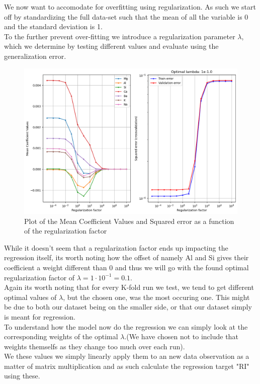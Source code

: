 We now want to accomodate for overfitting using regularization. As such we start off by standardizing the full data-set such that the mean of all the variable is 0 and the standard deviation is 1. \color[red]{It is worth noting that the helper function "rlr_validate" also standardizes its internal data partitions as a part of kfold cross-validation when it selects values of $\lambda$} \\
To the further prevent over-fitting we introduce a regularization parameter $\lambda$, which we determine by testing different values and evaluate using the generalization error.
\begin{figure}[H]
    \centering
    \includegraphics[width=15cm]{images/regularization.png}
    \caption{Plot of the Mean Coefficient Values and Squared error as a function of the regularization factor}
    \label{fig:regu_plot}
\end{figure}
While it doesn't seem that a regularization factor ends up impacting the regression itself, its worth noting how the offset of namely Al and Si gives their coefficient a weight different than 0 and thus we will go with the found optimal regularization factor of $\lambda = 1\cdot 10^{-1} = 0.1$. \\
Again its worth noting that for every K-fold run we test, we tend to get different optimal values of $\lambda$, but the chosen one, was the most occuring one. This might be due to both our dataset being on the smaller side, or that our dataset simply is meant for regression.\\

To understand how the model now do the regression we can simply look at the corresponding weights of the optimal $\lambda$.(We have chosen not to include that weights themselfs as they change too much over each run).\\We these values we simply linearly apply them to an new data observation as a matter of matrix multiplication and as such calculate the regression target "RI" using these.\\
\\
